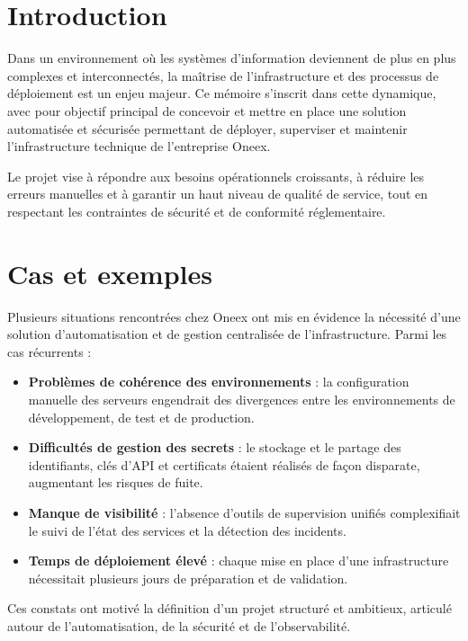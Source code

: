 \section{Introduction}

Dans un environnement où les systèmes d'information deviennent de plus en plus complexes et interconnectés, la maîtrise de l'infrastructure et des processus de déploiement est un enjeu majeur. Ce mémoire s'inscrit dans cette dynamique, avec pour objectif principal de concevoir et mettre en place une solution automatisée et sécurisée permettant de déployer, superviser et maintenir l'infrastructure technique de l'entreprise Oneex.

Le projet vise à répondre aux besoins opérationnels croissants, à réduire les erreurs manuelles et à garantir un haut niveau de qualité de service, tout en respectant les contraintes de sécurité et de conformité réglementaire.

\section{Cas et exemples}

Plusieurs situations rencontrées chez Oneex ont mis en évidence la nécessité d'une solution d'automatisation et de gestion centralisée de l'infrastructure. Parmi les cas récurrents :

\begin{itemize}
	\item \textbf{Problèmes de cohérence des environnements} : la configuration manuelle des serveurs engendrait des divergences entre les environnements de développement, de test et de production.
	\item \textbf{Difficultés de gestion des secrets} : le stockage et le partage des identifiants, clés d'API et certificats étaient réalisés de façon disparate, augmentant les risques de fuite.
	\item \textbf{Manque de visibilité} : l'absence d'outils de supervision unifiés complexifiait le suivi de l'état des services et la détection des incidents.
	\item \textbf{Temps de déploiement élevé} : chaque mise en place d'une infrastructure nécessitait plusieurs jours de préparation et de validation.
\end{itemize}

Ces constats ont motivé la définition d'un projet structuré et ambitieux, articulé autour de l'automatisation, de la sécurité et de l'observabilité.

